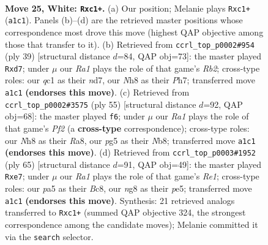 \documentclass[11pt]{article}
\begin{document}
\clearpage

\begin{figure}[p]\centering
\begin{subfigure}{0.46\textwidth}\centering
\resizebox{\linewidth}{!}{%
\newchessgame
\chessboard[
  setfen={r1k3nN/3n4/8/pp2pbpp/8/b4P1P/P5PR/R1q1K3 w - - 0 25},
  showmover=false,
  pgfstyle=straightmove, color=movearrow, markmove={a1-c1}
]}
\caption{}
\end{subfigure}\hfill
\begin{subfigure}{0.46\textwidth}\centering
\resizebox{\linewidth}{!}{%
\newchessgame
\chessboard[
  setfen={5k1r/1r1N1p1p/p1n3p1/1p6/3BP3/8/PP3PPP/4K2R b K - 2 20},
  showmover=false,
  pgfstyle=straightmove, color=movearrow, markmove={b7-d7}
]}
\caption{}
\end{subfigure}
\\[4pt]
\begin{subfigure}{0.46\textwidth}\centering
\resizebox{\linewidth}{!}{%
\newchessgame
\chessboard[
  setfen={rnr5/pn2kpp1/1p6/4p1BP/P3P3/R1P2P2/3KB3/7R b - - 0 28},
  showmover=false,
  pgfstyle=straightmove, color=movearrow, markmove={f7-f6}
]}
\caption{}
\end{subfigure}\hfill
\begin{subfigure}{0.46\textwidth}\centering
\resizebox{\linewidth}{!}{%
\newchessgame
\chessboard[
  setfen={2b1r3/p3Q2k/4p1pp/3pP3/2p4P/2P5/2P1BPP1/4R1K1 b - - 0 33},
  showmover=false,
  pgfstyle=straightmove, color=movearrow, markmove={e8-e7}
]}
\caption{}
\end{subfigure}
\caption{\textbf{Move 25, White: \texttt{Rxc1+}.} (a) Our position; Melanie plays \texttt{Rxc1+} (\texttt{a1c1}). Panels (b)--(d) are the retrieved master positions whose correspondence most drove this move (highest QAP objective among those that transfer to it). (b) Retrieved from \texttt{ccrl\_top\_p0002\#954} (ply 39) [structural distance $d$=84, QAP obj=73]: the master played \texttt{Rxd7}; under $\mu$ our \emph{Ra1} plays the role of that game's \emph{Rb2}; cross-type roles: our \emph{q}c1 as their \emph{n}d7, our \emph{N}h8 as their \emph{P}h7; transferred move \texttt{a1c1} \textbf{(endorses this move)}. (c) Retrieved from \texttt{ccrl\_top\_p0002\#3575} (ply 55) [structural distance $d$=92, QAP obj=68]: the master played \texttt{f6}; under $\mu$ our \emph{Ra1} plays the role of that game's \emph{Pf2} (a \textbf{cross-type} correspondence); cross-type roles: our \emph{N}h8 as their \emph{R}a8, our \emph{p}g5 as their \emph{N}b8; transferred move \texttt{a1c1} \textbf{(endorses this move)}. (d) Retrieved from \texttt{ccrl\_top\_p0003\#1952} (ply 65) [structural distance $d$=91, QAP obj=49]: the master played \texttt{Rxe7}; under $\mu$ our \emph{Ra1} plays the role of that game's \emph{Re1}; cross-type roles: our \emph{p}a5 as their \emph{B}c8, our \emph{n}g8 as their \emph{p}e5; transferred move \texttt{a1c1} \textbf{(endorses this move)}. Synthesis: 21 retrieved analogs transferred to \texttt{Rxc1+} (summed QAP objective 324, the strongest correspondence among the candidate moves); Melanie committed it via the \texttt{search} selector.}
\label{fig:thought-m48}
\end{figure}
\end{document}
